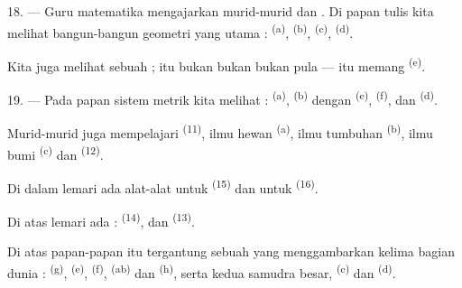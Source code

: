 \VUsaut{5.0mm}
\VUsaut{3.6mm}

18. --- Guru matematika mengajarkan  murid-murid
 dan . Di papan tulis kita melihat bangun-bangun geometri yang
utama :  \textsuperscript{(a)},  \textsuperscript{(b)}, 
\textsuperscript{(c)},  \textsuperscript{(d)}.

Kita juga melihat sebuah  ; itu bukan
 bukan  bukan pula
 — itu memang 
\textsuperscript{(e)}.

19. --- Pada papan sistem metrik kita melihat : 
\textsuperscript{(a)},  \textsuperscript{(b)} dengan
  \textsuperscript{(e)},
 \textsuperscript{(f)},  dan
 \textsuperscript{(d)}.

Murid-murid juga mempelajari  \textsuperscript{(11)},
ilmu hewan \textsuperscript{(a)}, ilmu tumbuhan \textsuperscript{(b)},
ilmu bumi \textsuperscript{(c)} dan 
\textsuperscript{(12)}.

Di dalam lemari ada alat-alat untuk 
\textsuperscript{(15)} dan untuk  \textsuperscript{(16)}.

Di atas lemari ada :  \textsuperscript{(14)},
 dan  \textsuperscript{(13)}.

Di atas papan-papan itu tergantung sebuah  yang
menggambarkan kelima bagian dunia : 
\textsuperscript{(g)},  \textsuperscript{(e)},
 \textsuperscript{(f)}, 
\textsuperscript{(ab)} dan  \textsuperscript{(h)},
serta kedua samudra besar,  \textsuperscript{(c)} dan
 \textsuperscript{(d)}.

\VUsaut{6.0mm}
\VUfilet{22mm}
